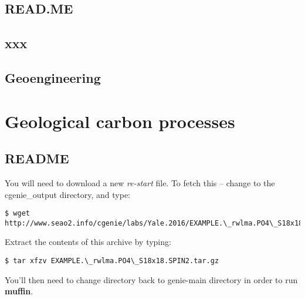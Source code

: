 \documentclass[11pt,fleqn]{book} %
\begin{document}
\newpage


\section*{READ.ME}



\newpage


\section{xxx}



\newpage


\section{Geoengineering}


\cleardoublepage


\chapter{Geological carbon processes}

\hfill \break


\newpage


\section*{README}

You will need to download a new \textit{re-start} file. To fetch this -- change to the \textsf{\footnotesize cgenie\_output directory}, and type:
\vspace{-1mm}\small\begin{verbatim}
$ wget http://www.seao2.info/cgenie/labs/Yale.2016/EXAMPLE.\_rwlma.PO4\_S18x18.SPIN2.tar.gz
\end{verbatim}\normalsize\vspace{-1mm}
\noindent Extract the contents of this archive by typing:
\vspace{-1mm}\small\begin{verbatim}
$ tar xfzv EXAMPLE.\_rwlma.PO4\_S18x18.SPIN2.tar.gz 
\end{verbatim}\normalsize\vspace{-1mm}
You’ll then need to change directory back to \textsf{\footnotesize genie-main } directory in order to run \textbf{muffin}.
\end{document}
